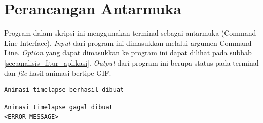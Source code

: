 \section{Perancangan Antarmuka}
\label{sec:perancangan_antarmuka}
Program dalam skripsi ini menggunakan terminal sebagai antarmuka (Command Line Interface). \textit{Input} dari program ini dimasukkan melalui argumen Command Line. \textit{Option} yang dapat dimasukkan ke program ini dapat dilihat pada subbab \ref{sec:analisis_fitur_aplikasi}. \textit{Output} dari program ini berupa status pada terminal dan \textit{file} hasil animasi bertipe GIF.  

\begin{lstlisting}[caption={Status pesan yang muncul pada terminal saat program berhasil membangkitkan animasi \textit{timelapse}.},label={lst:status_pesan_berhasil},language=plaintext]
Animasi timelapse berhasil dibuat
\end{lstlisting}

\begin{lstlisting}[caption={Status pesan yang muncul pada terminal saat program gagal membangkitkan animasi \textit{timelapse}.},label={lst:status_pesan_gagal},language=plaintext]
Animasi timelapse gagal dibuat
<ERROR MESSAGE>
\end{lstlisting}

